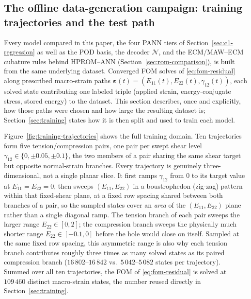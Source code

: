 \documentclass[10pt,a4paper]{article}
\begin{document}
\subsection{The offline data-generation campaign: training trajectories and the test path}
\label{sec:data-campaign}
Every model compared in this paper, the four PANN tiers of
Section~\ref{sec:c1-regression} as well as the POD basis, the decoder
$\mathcal N$, and the ECM/MAW--ECM cubature rules behind HPROM--ANN
(Section~\ref{sec:rom-comparison}), is built from the same underlying
dataset. Converged FOM solves of \eqref{eq:fom-residual} along
prescribed macro-strain paths $\bm\varepsilon(t)=(E_{11}(t),E_{22}(t),\gamma_{12}(t))$,
each solved state contributing one labeled triple (applied strain,
energy-conjugate stress, stored energy) to the dataset. This section
describes, once and explicitly, how those paths were chosen and how
large the resulting dataset is; Section~\ref{sec:training} states how it
is then split and used to train each model.

Figure~\ref{fig:training-trajectories} shows the full training domain.
Ten trajectories form five tension/compression pairs, one pair per
swept shear level $\gamma_{12}\in\{0,\pm0.05,\pm0.1\}$, the two members
of a pair sharing the same shear target but opposite normal-strain
branches. Every
trajectory is genuinely three-dimensional, not a single planar slice. It
first ramps $\gamma_{12}$ from $0$ to its target value at
$E_{11}=E_{22}=0$, then sweeps $(E_{11},E_{22})$ in a boustrophedon
(zig-zag) pattern within that fixed-shear plane, at a fixed row spacing
shared between both branches of a pair, so the sampled states cover an
\emph{area} of the $(E_{11},E_{22})$ plane rather than a single diagonal
ramp. The tension branch of each pair sweeps the larger range
$E_{22}\in[0,2]$; the compression branch sweeps the physically much
shorter range $E_{22}\in[-0.1,0]$ before the hole would close on
itself. Sampled at the same fixed row spacing, this asymmetric range is
also why each tension branch contributes roughly three times as many
solved states as its paired compression branch ($16\,802$--$16\,842$ vs.\
$5\,042$--$5\,082$ states per trajectory). Summed over all ten
trajectories, the FOM of \eqref{eq:fom-residual} is solved at
$109\,460$ distinct macro-strain states, the number reused directly in
Section~\ref{sec:training}.
\end{document}
